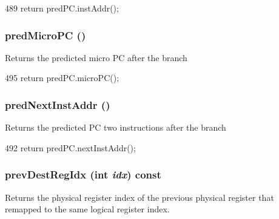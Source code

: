 \begin{DoxyCode}
489 { return predPC.instAddr(); }
\end{DoxyCode}
\hypertarget{classBaseDynInst_acc3cf1eeb9bc53f3e6660fbceea961ee}{
\subsubsection[{predMicroPC}]{ predMicroPC ()}}
\label{classBaseDynInst_acc3cf1eeb9bc53f3e6660fbceea961ee}
Returns the predicted micro PC after the branch 


\begin{DoxyCode}
495 { return predPC.microPC(); }
\end{DoxyCode}
\hypertarget{classBaseDynInst_aabf159b9ae9ff5a404a04ef091d1f2d1}{
\subsubsection[{predNextInstAddr}]{ predNextInstAddr ()}}
\label{classBaseDynInst_aabf159b9ae9ff5a404a04ef091d1f2d1}
Returns the predicted PC two instructions after the branch 


\begin{DoxyCode}
492 { return predPC.nextInstAddr(); }
\end{DoxyCode}
\hypertarget{classBaseDynInst_a0e34129e87398c9ff1f764e577b7b79f}{
\subsubsection[{prevDestRegIdx}]{ prevDestRegIdx (int {\em idx}) const}}
\label{classBaseDynInst_a0e34129e87398c9ff1f764e577b7b79f}
Returns the physical register index of the previous physical register that remapped to the same logical register index. 


